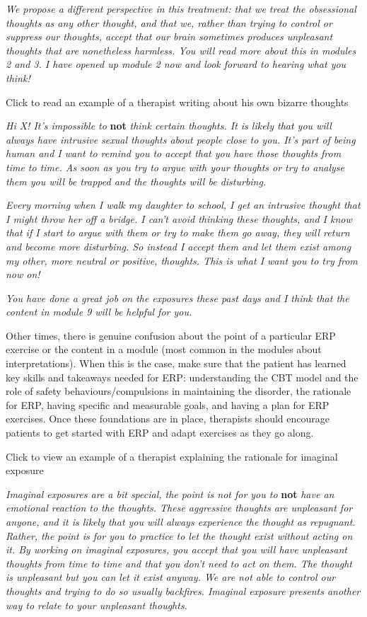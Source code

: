 \documentclass[]{book}
\begin{document}
\emph{We propose a different perspective in this treatment: that we treat the obsessional thoughts as any other thought, and that we, rather than trying to control or suppress our thoughts, accept that our brain sometimes produces unpleasant thoughts that are nonetheless harmless. You will read more about this in modules 2 and 3. I have opened up module 2 now and look forward to hearing what you think!}

Click to read an example of a therapist writing about his own bizarre thoughts

\emph{Hi X! It's impossible to} \textbf{not} \emph{think certain thoughts. It is likely that you will always have intrusive sexual thoughts about people close to you. It's part of being human and I want to remind you to accept that you have those thoughts from time to time. As soon as you try to argue with your thoughts or try to analyse them you will be trapped and the thoughts will be disturbing.}

\emph{Every morning when I walk my daughter to school, I get an intrusive thought that I might throw her off a bridge. I can't avoid thinking these thoughts, and I know that if I start to argue with them or try to make them go away, they will return and become more disturbing. So instead I accept them and let them exist among my other, more neutral or positive, thoughts. This is what I want you to try from now on!}

\emph{You have done a great job on the exposures these past days and I think that the content in module 9 will be helpful for you.}

Other times, there is genuine confusion about the point of a particular ERP exercise or the content in a module (most common in the modules about interpretations). When this is the case, make sure that the patient has learned key skills and takeaways needed for ERP: understanding the CBT model and the role of safety behaviours/compulsions in maintaining the disorder, the rationale for ERP, having specific and measurable goals, and having a plan for ERP exercises. Once these foundations are in place, therapists should encourage patients to get started with ERP and adapt exercises as they go along.

Click to view an example of a therapist explaining the rationale for imaginal exposure

\emph{Imaginal exposures are a bit special, the point is not for you to} \textbf{not} \emph{have an emotional reaction to the thoughts. These aggressive thoughts are unpleasant for anyone, and it is likely that you will always experience the thought as repugnant. Rather, the point is for you to practice to let the thought exist without acting on it. By working on imaginal exposures, you accept that you will have unpleasant thoughts from time to time and that you don't need to act on them. The thought is unpleasant but you can let it exist anyway. We are not able to control our thoughts and trying to do so usually backfires. Imaginal exposure presents another way to relate to your unpleasant thoughts.}
\end{document}
